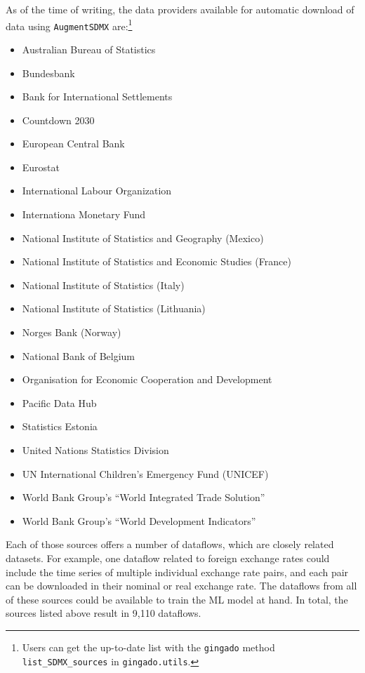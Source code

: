 \documentclass{article}
\begin{document}
As of the time of writing, the data providers available for automatic download of data using \texttt{AugmentSDMX} are:\footnote{Users can get the up-to-date list with the \texttt{gingado} method \texttt{list\_SDMX\_sources} in \texttt{gingado.utils}.}
\begin{itemize}
    \item Australian Bureau of Statistics
    \item Bundesbank
    \item Bank for International Settlements
    \item Countdown 2030
    \item European Central Bank
    \item Eurostat
    \item International Labour Organization
    \item Internationa Monetary Fund
    \item National Institute of Statistics and Geography (Mexico)
    \item National Institute of Statistics and Economic Studies (France)
    \item National Institute of Statistics (Italy)
    \item National Institute of Statistics (Lithuania)
    \item Norges Bank (Norway)
    \item National Bank of Belgium
    \item Organisation for Economic Cooperation and Development
    \item Pacific Data Hub
    \item Statistics Estonia
    \item United Nations Statistics Division
    \item UN International Children’s Emergency Fund (UNICEF)
    \item World Bank Group’s “World Integrated Trade Solution”
    \item World Bank Group’s “World Development Indicators”
\end{itemize}

Each of those sources offers a number of dataflows, which are closely related datasets. For example, one dataflow related to foreign exchange rates could include the time series of multiple individual exchange rate pairs, and each pair can be downloaded in their nominal or real exchange rate. The dataflows from all of these sources could be available to train the ML model at hand. In total, the sources listed above result in 9,110 dataflows.
\end{document}
